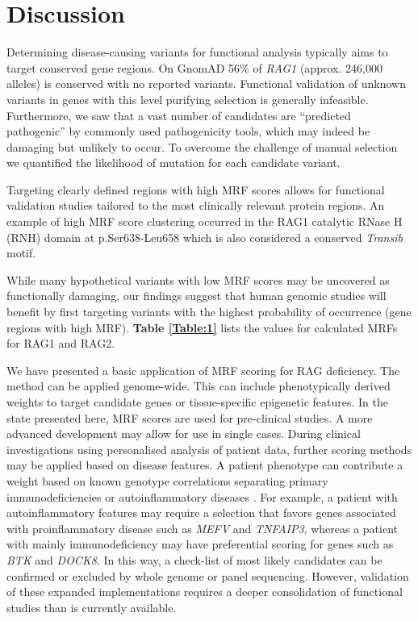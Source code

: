 \documentclass[preprint,11pt,fleqn]{elsarticle}
\begin{document}

\section*{Discussion}
\noindent Determining disease-causing variants for functional analysis typically aims to target conserved gene regions. 
On GnomAD 56\% of \textit{RAG1} (approx. 246,000 alleles) is conserved with no reported variants. 
Functional validation of unknown variants in genes with this level purifying selection is generally infeasible. 
Furthermore, we saw that a vast number of candidates are ``predicted pathogenic'' by commonly used pathogenicity tools, which may indeed be damaging but unlikely to occur.
To overcome the challenge of manual selection we quantified the likelihood of mutation for each candidate variant.

Targeting clearly defined regions with high MRF scores allows for functional validation studies tailored to the most clinically relevant protein regions. 
An example of high MRF score clustering occurred in the RAG1 catalytic RNase H (RNH) domain at p.Ser638-Leu658 which is also considered a conserved \textit{Transib} motif. 

While many hypothetical variants with low MRF scores may be uncovered as functionally damaging, our findings suggest that human genomic studies will benefit by first targeting variants with the highest probability of occurrence (gene regions with high MRF). 
\textbf{Table 
\ref{Table:1}} lists the values for calculated MRFs for RAG1 and RAG2.

We have presented a basic application of MRF scoring for RAG deficiency. 
The method can be applied genome-wide.
This can include phenotypically derived weights to target candidate genes or tissue-specific epigenetic features. 
In the state presented here, MRF scores are used for pre-clinical studies. 
A more advanced development may allow for use in single cases. 
During clinical investigations using personalised analysis of patient data, further scoring methods may be applied based on disease features. 
A patient phenotype can contribute a weight based on known genotype correlations separating primary immunodeficiencies or autoinflammatory diseases \citep{picard2018international}. 
For example, a patient with autoinflammatory features may require a selection that favors genes associated with proinflammatory disease such as \textit{MEFV} and \textit{TNFAIP3}, whereas a patient with mainly immunodeficiency may have preferential scoring for genes such as \textit{BTK} and \textit{DOCK8}. 
In this way, a check-list of most likely candidates can be confirmed or excluded by whole genome or panel sequencing. 
However, validation of these expanded implementations requires a deeper consolidation of functional studies than is currently available. 
\end{document}
